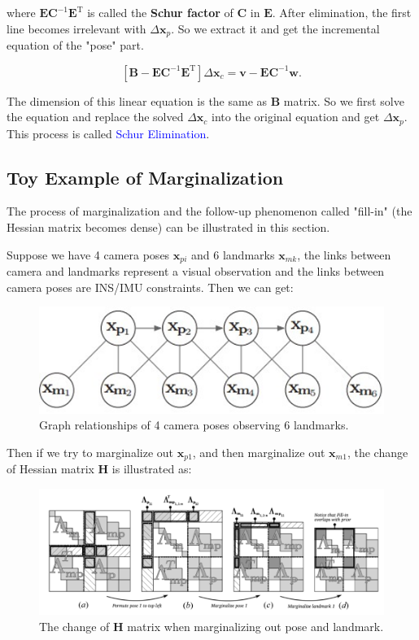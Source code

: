 \documentclass[12pt]{report}   %
\begin{document}
where $\bm{E}\bm{C}^{-1}\bm{E}^\mathrm{T}$ is called the \textbf{Schur factor} of $\bm{C}$ in $\bm{E}$. After elimination, the first line becomes irrelevant with $\Delta \bm{x}_p$. So we extract it and get the incremental equation of the "pose" part.

\begin{equation}
\left[ 
\bm{B} - \bm{E}\bm{C}^{-1}\bm{E}^\mathrm{T}
\right]
\Delta \bm{x}_c  = 
\bm{v} - \bm{E}\bm{C}^{-1}\bm{w}.
\label{eq:marginalization}
\end{equation}

The dimension of this linear equation is the same as $\bm{B}$ matrix. So we first solve the equation and replace the solved $\Delta \bm{x}_c$ into the original equation and get $\Delta \bm{x}_p$. This process is called \textcolor{blue}{Schur Elimination}. 


\subsection{Toy Example of Marginalization}

The process of marginalization and the follow-up phenomenon called "fill-in" (the Hessian matrix becomes dense) can be illustrated in this section. 

Suppose we have 4 camera poses $\bm{x}_{pi}$ and 6 landmarks $\bm{x}_{mk}$, the links between camera and landmarks represent a visual observation and the links between camera poses are INS/IMU constraints. Then we can get:


\begin{figure}[H]
	\centering
	\includegraphics[width=.6\linewidth]{figures/before_marg.png}
	\caption{Graph relationships of 4 camera poses observing 6 landmarks.}
	\label{fig:before_marg}
\end{figure}

Then if we try to marginalize out $\bm{x}_{p1}$, and then marginalize out $\bm{x}_{m1}$, the change of Hessian matrix $\bm{H}$ is illustrated as:

\begin{figure}[H]
	\centering
	\includegraphics[width=1.0\linewidth]{figures/marg_process_fillin.png}
	\caption{The change of $\bm{H}$ matrix when marginalizing out pose and landmark.}
	\label{fig:marg_process_fillin}
\end{figure}
\end{document}
